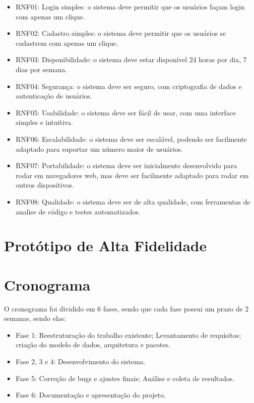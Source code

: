 \begin{itemize}
    \item RNF01: Login simples: o sistema deve permitir que os usuários façam login com apenas um clique.
    \item RNF02: Cadastro simples: o sistema deve permitir que os usuários se cadastrem com apenas um clique.
    \item RNF03: Disponibilidade: o sistema deve estar disponível 24 horas por dia, 7 dias por semana.
    \item RNF04: Segurança: o sistema deve ser seguro, com criptografia de dados e autenticação de usuários.
    \item RNF05: Usabilidade: o sistema deve ser fácil de usar, com uma interface simples e intuitiva.
    \item RNF06: Escalabilidade: o sistema deve ser escalável, podendo ser facilmente adaptado para suportar um número maior de usuários.
    \item RNF07: Portabilidade: o sistema deve ser inicialmente desenvolvido para rodar em navegadores web, mas deve ser facilmente adaptado para rodar em outros dispositivos.
    \item RNF08: Qualidade: o sistema deve ser de alta qualidade, com ferramentas de analise de código e testes automatizados.
\end{itemize}

\section{Protótipo de Alta Fidelidade}


\section{Cronograma}

O cronograma foi dividido em 6 fases, sendo que cada fase possui um prazo de 2 semanas, sendo elas:

\begin{itemize}
    \item Fase 1: Reestruturação do trabalho existente; Levantamento de requisitos; criação do modelo de dados, arquitetura e pacotes.
    \item Fase 2, 3 e 4: Desenvolvimento do sistema.
    \item Fase 5: Correção de bugs e ajustes finais; Análise e coleta de resultados.
    \item Fase 6: Documentação e apresentação do projeto.
\end{itemize}

